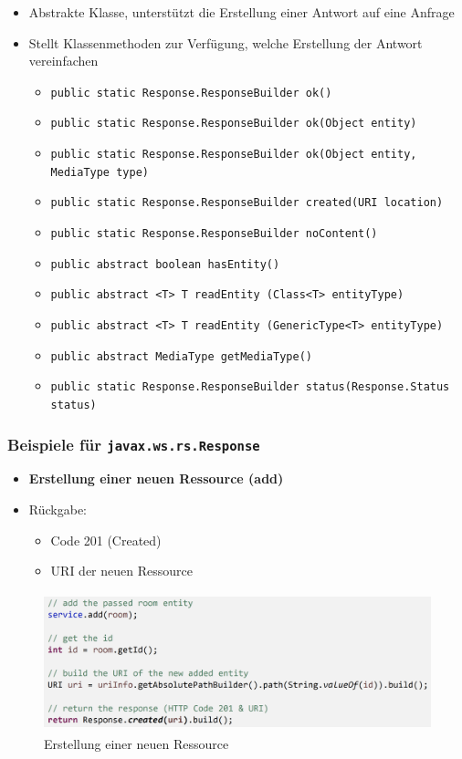 \documentclass[a4paper]{article}
\begin{document}
			\begin{itemize}
				\item Abstrakte Klasse, unterstützt die Erstellung einer Antwort auf eine Anfrage
				\item Stellt Klassenmethoden zur Verfügung, welche Erstellung der Antwort vereinfachen
					\begin{itemize}
						\item \texttt{public static Response.ResponseBuilder ok()}
						\item \texttt{public static Response.ResponseBuilder ok(Object entity)}
						\item \texttt{public static Response.ResponseBuilder ok(Object entity, MediaType type)}
						\item \texttt{public static Response.ResponseBuilder created(URI location)}
						\item \texttt{public static Response.ResponseBuilder noContent()}
						\item \texttt{public abstract boolean hasEntity()}
						\item \texttt{public abstract <T> T readEntity (Class<T> entityType)}
						\item \texttt{public abstract <T> T readEntity (GenericType<T> entityType)}
						\item \texttt{public abstract MediaType getMediaType()}
						\item \texttt{public static Response.ResponseBuilder status(Response.Status status)}
					\end{itemize}
			\end{itemize}
		
		\subsubsection{Beispiele für \texttt{javax.ws.rs.Response}}
		
			\begin{itemize}
				\item \textbf{Erstellung einer neuen Ressource (add)}
				\item Rückgabe:
					\begin{itemize}
						\item Code 201 (Created)
						\item URI der neuen Ressource
					\end{itemize}
			\end{itemize}
			\begin{figure}[!htb]
				\centering
				\includegraphics[keepaspectratio, height=4cm]{img/ws/resp_01.png}
				\caption{Erstellung einer neuen Ressource}
				\label{fig:resp_01}
			\end{figure}
		
\end{document}

